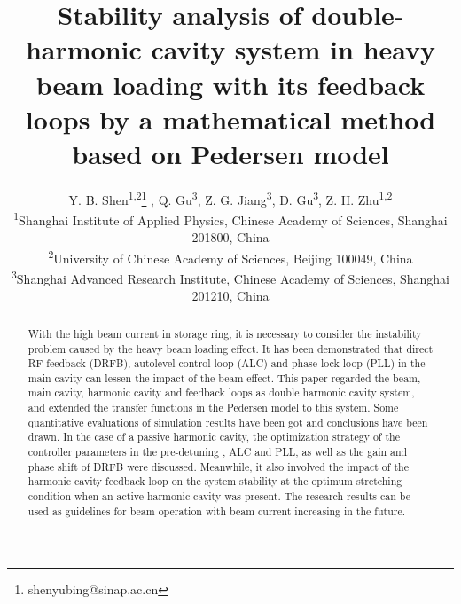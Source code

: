 \documentclass[letterpaper,
               nospread,     %
               ]{jacow}
\begin{document}
\title{Stability analysis of double-harmonic cavity system in heavy beam loading with its feedback loops by a mathematical method based on Pedersen model}
\author{Y. B. Shen\textsuperscript{1,2}\thanks{shenyubing@sinap.ac.cn}
   , Q. Gu\textsuperscript{3}, Z. G. Jiang\textsuperscript{3}, D. Gu\textsuperscript{3}, Z. H. Zhu\textsuperscript{1,2}\\
   \textsuperscript{1}Shanghai Institute of Applied Physics, Chinese Academy of Sciences, Shanghai 201800, China\\
   \textsuperscript{2}University of Chinese Academy of Sciences, Beijing 100049, China\\
   \textsuperscript{3}Shanghai Advanced Research Institute, Chinese Academy of Sciences, Shanghai 201210, China}
\maketitle

\begin{abstract}
   With the high beam current in storage ring, it is necessary to consider the instability problem caused by the heavy beam loading effect. It has been demonstrated that direct RF feedback (DRFB), autolevel control loop (ALC) and phase-lock loop (PLL) in the main cavity can lessen the impact of the beam effect. This paper regarded the beam, main cavity, harmonic cavity and feedback loops as double harmonic cavity system, and extended the transfer functions in the Pedersen model to this system. Some quantitative evaluations of simulation results have been got and conclusions have been drawn. In the case of a passive harmonic cavity, the optimization strategy of the controller parameters in the pre-detuning , ALC and PLL, as well as the gain and phase shift of DRFB were discussed. Meanwhile, it also involved the impact of the harmonic cavity feedback loop on the system stability at the optimum stretching condition when an active harmonic cavity was present. The research results can be used as guidelines for beam operation with beam current increasing in the future.
\end{abstract}
\end{document}

